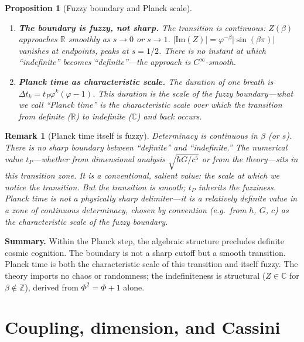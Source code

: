 \documentclass[12pt,a4paper]{article}
\newtheorem{proposition}[theorem]{Proposition}
\newtheorem{remark}[theorem]{Remark}
\begin{document}
\begin{proposition}[Fuzzy boundary and Planck scale]
\label{prop:fuzzy-boundary}
\begin{enumerate}[nosep]
\item \textbf{The boundary is fuzzy, not sharp.} The transition is continuous: $Z(\beta)$ approaches $\mathbb{R}$ smoothly as $s \to 0$ or $s \to 1$. $|\mathrm{Im}(Z)| = \varphi^{-\beta}|\sin(\beta\pi)|$ vanishes at endpoints, peaks at $s = 1/2$. There is no instant at which ``indefinite'' becomes ``definite''---the approach is $C^\infty$-smooth.
\item \textbf{Planck time as characteristic scale.} The duration of one breath is $\Delta t_k = t_P\varphi^k(\varphi-1)$. This duration \emph{is} the scale of the fuzzy boundary---what we call ``Planck time'' is the characteristic scale over which the transition from definite ($\mathbb{R}$) to indefinite ($\mathbb{C}$) and back occurs.
\end{enumerate}
\end{proposition}

\begin{remark}[Planck time itself is fuzzy]
\label{rem:planck-fuzzy}
Determinacy is continuous in $\beta$ (or $s$). There is no sharp boundary between ``definite'' and ``indefinite.'' The numerical value $t_P$---whether from dimensional analysis $\sqrt{\hbar G/c^5}$ or from the theory---sits in this transition zone. It is a conventional, salient value: the scale at which we notice the transition. But the transition is smooth; $t_P$ inherits the fuzziness. Planck time is not a physically sharp delimiter---it is a relatively definite value in a zone of continuous determinacy, chosen by convention (e.g.\ from $\hbar$, $G$, $c$) as the characteristic scale of the fuzzy boundary.
\end{remark}

\medskip
\noindent\textbf{Summary.} Within the Planck step, the algebraic structure precludes definite cosmic cognition. The boundary is not a sharp cutoff but a smooth transition. Planck time is both the characteristic scale of this transition and itself fuzzy. The theory imports no chaos or randomness; the indefiniteness is structural ($Z \in \mathbb{C}$ for $\beta \notin \mathbb{Z}$), derived from $\Phi^2 = \Phi + 1$ alone.

\section{Coupling, dimension, and Cassini}
\label{sec:coupling}
\label{sec:trunk-coupling}
\label{sec:propagator-quantum}
\end{document}
